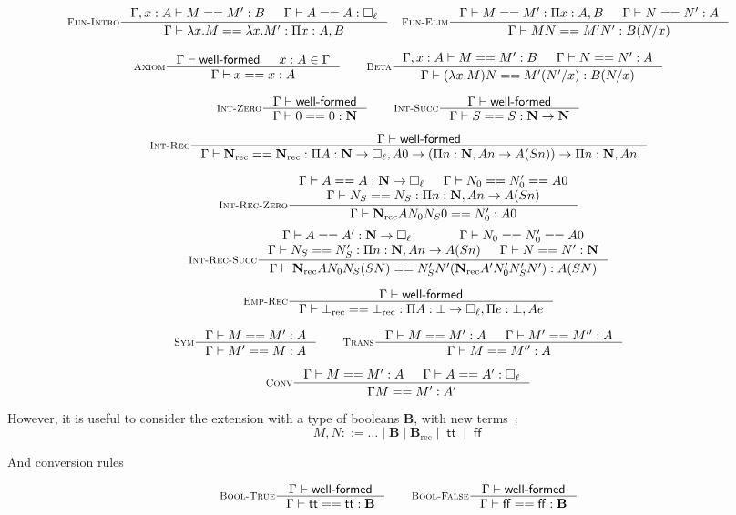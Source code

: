\documentclass[11pt]{article}
\DeclareMathOperator{\rec}{rec}
\DeclareMathOperator{\true}{\mathsf{tt}}
\DeclareMathOperator{\false}{\mathsf{ff}}
\newcommand{\0}{\mathbf{0}}
\newcommand{\1}{\mathbf{1}}
\newcommand{\nat}{\mathbf{N}}
\newcommand{\bool}{\mathbf{B}}
\newcommand{\tctx}{\Gamma}
\newcommand{\Wf}{\textsf{well-formed}}
\begin{document}
$$
    \inference[\textsc{Fun-Intro}]{\tctx, x : A |- M == M' : B &\tctx |- A == A : \square_\ell}{\tctx |- \lambda x. M == \lambda x. M' : \Pi x : A, B} \quad
    \inference[\textsc{Fun-Elim}]{\tctx |- M == M' : \Pi x:A, B& \tctx |- N == N' : A}{\tctx |- MN == M'N' : B(N/x)}
$$

$$
    \inference[\textsc{Axiom}]{\tctx |- \Wf & x : A \in \tctx }{\tctx |- x == x : A} \qquad
    \inference[\textsc{Beta}]{\tctx, x : A |- M == M' : B & \tctx |- N == N' : A}{\tctx |- (\lambda x. M)N == M'(N'/x) : B(N/x)}
$$

$$
    \inference[\textsc{Int-Zero}]{\tctx |- \Wf}{\tctx |- 0 == 0 : \nat} \qquad
    \inference[\textsc{Int-Succ}]{\tctx |- \Wf}{\tctx |- S == S : \nat -> \nat}
$$

$$
    \inference[\textsc{Int-Rec}]{\tctx |- \Wf}{\tctx |- \nat_{\rec} == \nat_{\rec} : \Pi A : \nat \to \square_\ell, A 0 \to \left(\Pi n:\nat, A n \to A (S n)\right) \to \Pi n :\nat, A n}
$$


$$
    \inference[\textsc{Int-Rec-Zero}]{\tctx |- A == A : \nat -> \square_\ell & \tctx |- N_0 == N'_0 == A 0\\ \tctx |- N_S == N_S : \Pi n:\nat, A n -> A(S n)}{\tctx |- \nat_{\rec} A N_0N_S0 == N'_0 : A 0}
$$
$$
    \inference[\textsc{Int-Rec-Succ}]{\tctx |- A == A' : \nat -> \square_\ell & \tctx |- N_0 == N'_0 == A 0\\ \tctx |- N_S == N'_S : \Pi n:\nat, A n -> A(S n) & \tctx |- N == N' :\nat}{\tctx |- \nat_{\rec} A N_0N_S (S N) == N'_S N' (\nat_{\rec}A' N'_0 N'_S N') : A (S N)}
$$


$$
    \inference[\textsc{Emp-Rec}]{\tctx |- \Wf}{\tctx |- \bot_{\rec} == \bot_{\rec} : \Pi A : \bot \to \square_\ell,\Pi e :\bot, A e}
$$

$$
    \inference[\textsc{Sym}]{\tctx |- M == M' : A}{\tctx |- M' == M : A} \qquad
    \inference[\textsc{Trans}]
    {\tctx |- M == M' :A & \tctx |- M' == M'' : A}{\tctx |- M == M'' : A}
$$

$$
    \inference[\textsc{Conv}]
    {\tctx |- M == M' :A & \tctx |- A == A' : \square_\ell}{\tctx M ==M' : A'}
$$

However, it is useful to consider the extension with a type of booleans $\bool$, with new terms~:
 $$ M,N ::= \dots \mid \bool\mid \bool_{\rec}\mid \true\mid \false $$

 And conversion rules

$$
    \inference[\textsc{Bool-True}]{\tctx |- \Wf}{\tctx |- \true == \true : \bool} \qquad
    \inference[\textsc{Bool-False}]{\tctx |- \Wf}{\tctx |- \false == \false : \bool}
$$
\end{document}
